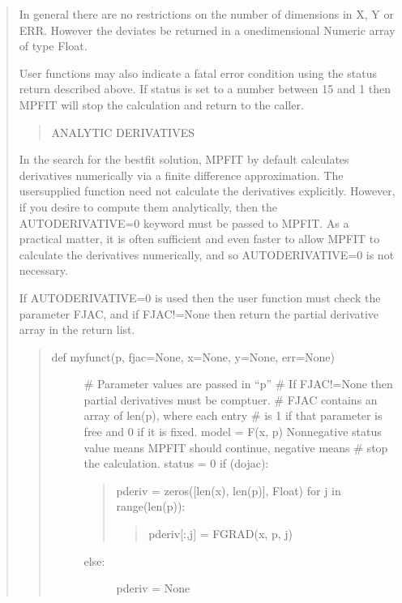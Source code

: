 \documentclass[letterpaper,10pt,english]{sphinxmanual}
\begin{document}
\begin{quote}
In general there are no restrictions on the number of dimensions in
X, Y or ERR.  However the deviates  be returned in a
one\sphinxhyphen{}dimensional Numeric array of type Float.

User functions may also indicate a fatal error condition using the
status return described above. If status is set to a number between
\sphinxhyphen{}15 and \sphinxhyphen{}1 then MPFIT will stop the calculation and return to the caller.
\begin{quote}

ANALYTIC DERIVATIVES
\end{quote}

In the search for the best\sphinxhyphen{}fit solution, MPFIT by default
calculates derivatives numerically via a finite difference
approximation.  The user\sphinxhyphen{}supplied function need not calculate the
derivatives explicitly.  However, if you desire to compute them
analytically, then the AUTODERIVATIVE=0 keyword must be passed to MPFIT.
As a practical matter, it is often sufficient and even faster to allow
MPFIT to calculate the derivatives numerically, and so
AUTODERIVATIVE=0 is not necessary.

If AUTODERIVATIVE=0 is used then the user function must check the parameter
FJAC, and if FJAC!=None then return the partial derivative array in the
return list.
\begin{quote}
\begin{description}
\item[{def myfunct(p, fjac=None, x=None, y=None, err=None)}] \leavevmode
\# Parameter values are passed in “p”
\# If FJAC!=None then partial derivatives must be comptuer.
\# FJAC contains an array of len(p), where each entry
\# is 1 if that parameter is free and 0 if it is fixed.
model = F(x, p)
Non\sphinxhyphen{}negative status value means MPFIT should continue, negative means
\# stop the calculation.
status = 0
if (dojac):
\begin{quote}

pderiv = zeros({[}len(x), len(p){]}, Float)
for j in range(len(p)):
\begin{quote}

pderiv{[}:,j{]} = FGRAD(x, p, j)
\end{quote}
\end{quote}
\begin{description}
\item[{else:}] \leavevmode
pderiv = None

\end{description}


\end{description}
\end{quote}
\end{quote}
\end{document}
